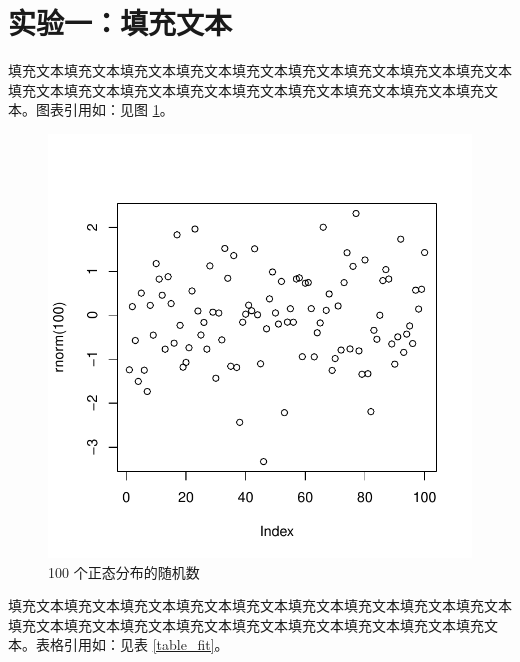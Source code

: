 \section{实验一：填充文本}

填充文本填充文本填充文本填充文本填充文本填充文本填充文本填充文本填充文本填充文本填充文本填充文本填充文本填充文本填充文本填充文本填充文本填充文本。图表引用如：见图 \ref{plot_random_points}。

\begin{figure}[htbp]
    \centering
    \includegraphics[width=0.5\linewidth]{Pictures/Exp1/plot_random_points.pdf}
    \caption{100 个正态分布的随机数}
    \label{plot_random_points}
\end{figure}

填充文本填充文本填充文本填充文本填充文本填充文本填充文本填充文本填充文本填充文本填充文本填充文本填充文本填充文本填充文本填充文本填充文本填充文本。表格引用如：见表 \ref{table_fit}。

